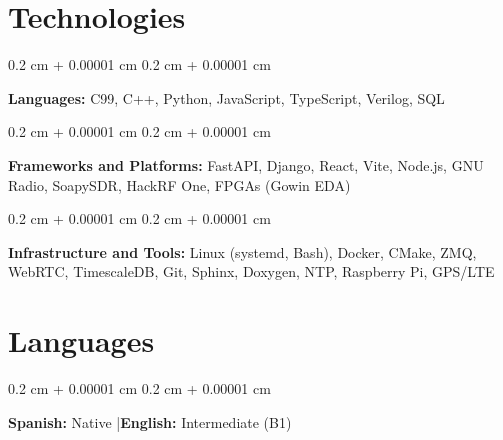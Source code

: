\documentclass[10pt, letterpaper]{article}
\newenvironment{onecolentry}{
    \begin{adjustwidth}{
        0.2 cm + 0.00001 cm
    }{
        0.2 cm + 0.00001 cm
    }
}{
    \end{adjustwidth}
} %
\begin{document}
        \vspace{0.2 cm}

    \section{Technologies}

        \begin{onecolentry}
            \textbf{Languages:} C99, C++, Python, JavaScript, TypeScript, Verilog, SQL
        \end{onecolentry}

        \vspace{0.2 cm}

        \begin{onecolentry}
            \textbf{Frameworks and Platforms:} FastAPI, Django, React, Vite, Node.js, GNU Radio, SoapySDR, HackRF One, FPGAs (Gowin EDA)
        \end{onecolentry}

        \vspace{0.2 cm}

        \begin{onecolentry}
            \textbf{Infrastructure and Tools:} Linux (systemd, Bash), Docker, CMake, ZMQ, WebRTC, TimescaleDB, Git, Sphinx, Doxygen, NTP, Raspberry Pi, GPS/LTE
        \end{onecolentry}

    \section{Languages}

        \begin{onecolentry}
            \textbf{Spanish:} Native \quad|\quad \textbf{English:} Intermediate (B1)
        \end{onecolentry}
\end{document}
